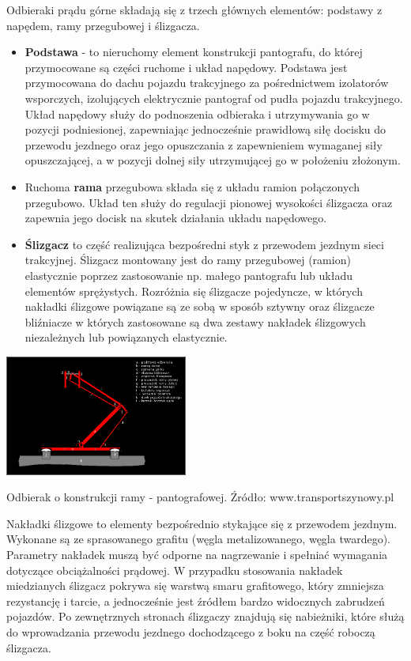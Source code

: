 Odbieraki prądu górne składają się z trzech głównych elementów: podstawy z napędem, ramy przegubowej i ślizgacza. 
\begin{itemize}
	\item \textbf{Podstawa} - to nieruchomy element konstrukcji pantografu, do której przymocowane są części ruchome i układ napędowy. Podstawa jest przymocowana do dachu pojazdu trakcyjnego za pośrednictwem izolatorów wsporczych, izolujących elektrycznie pantograf od pudła pojazdu trakcyjnego. Układ napędowy służy do podnoszenia odbieraka i utrzymywania go w pozycji podniesionej, zapewniając jednocześnie prawidłową siłę docisku do przewodu jezdnego oraz jego opuszczania z zapewnieniem wymaganej siły opuszczającej, a w pozycji dolnej siły utrzymującej go w położeniu złożonym. 

	\item Ruchoma \textbf{rama} przegubowa składa się z układu ramion połączonych przegubowo. Układ ten służy do regulacji pionowej wysokości ślizgacza oraz zapewnia jego docisk na skutek działania układu napędowego. 
	
	
	\item \textbf{Ślizgacz} to część realizująca bezpośredni styk z przewodem jezdnym sieci trakcyjnej. Ślizgacz montowany jest do ramy przegubowej (ramion) elastycznie poprzez zastosowanie np. małego pantografu lub układu elementów sprężystych. Rozróżnia się ślizgacze pojedyncze, w których nakładki ślizgowe powiązane są ze sobą w sposób sztywny oraz ślizgacze bliźniacze w których zastosowane są dwa zestawy nakładek ślizgowych niezależnych lub powiązanych elastycznie. 
\end{itemize}
\begin{marginfigure}
	\includegraphics[width=6cm]{skryptkierownik-img/kolodbierakschem2.png}
	\caption{Odbierak o konstrukcji ramy - pantografowej. Źródło: www.transportszynowy.pl}
	\label{fig:pantograf2}
\end{marginfigure}	
Nakładki ślizgowe to elementy bezpośrednio stykające się z przewodem jezdnym. Wykonane są ze sprasowanego grafitu (węgla metalizowanego, węgla twardego). Parametry nakładek muszą być odporne na nagrzewanie i spełniać wymagania dotyczące obciążalności prądowej. W przypadku stosowania nakładek miedzianych ślizgacz pokrywa się warstwą smaru grafitowego, który zmniejsza rezystancję i tarcie, a jednocześnie jest źródłem bardzo widocznych zabrudzeń pojazdów. 
Po zewnętrznych stronach ślizgaczy znajdują się nabieżniki, które służą do wprowadzania przewodu jezdnego dochodzącego z boku na część roboczą ślizgacza. 

